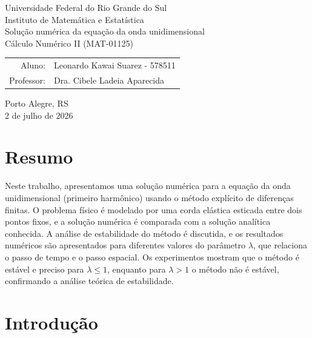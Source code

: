 \documentclass[11pt]{article}
\begin{document}
\nocite{burden, IK, moyses_ondas, stencil}

\begin{center}
    \large Universidade Federal do Rio Grande do Sul \\
    \large Instituto de Matemática e Estatística \\
    \vspace{4cm}
    \huge Solução numérica da equação da onda unidimensional \\
    \vspace{1cm}
    \Large Cálculo Numérico II (MAT-01125)  \\
    \vspace{4cm}

    \large\begin{tabular}{rl}
        Aluno: & Leonardo Kawai Suarez - 578511 \\
        Professor: & Dra. Cibele Ladeia Aparecida \\
    \end{tabular}

    \vfill
    \large Porto Alegre, RS \\
    \large 2 de julho de 2026
\end{center}

\newpage
\tableofcontents

\section{Resumo}

Neste trabalho, apresentamos uma solução numérica para a equação da onda unidimensional (primeiro harmônico) usando o método explícito de diferenças finitas. O problema físico é modelado por uma corda elástica esticada entre dois pontos fixos, e a solução numérica é comparada com a solução analítica conhecida. A análise de estabilidade do método é discutida, e os resultados numéricos são apresentados para diferentes valores do parâmetro \(\lambda\), que relaciona o passo de tempo e o passo espacial. Os experimentos mostram que o método é estável e preciso para \(\lambda \leq 1\), enquanto para \(\lambda > 1\) o método não é estável, confirmando a análise teórica de estabilidade.

\section{Introdução}
\end{document}
